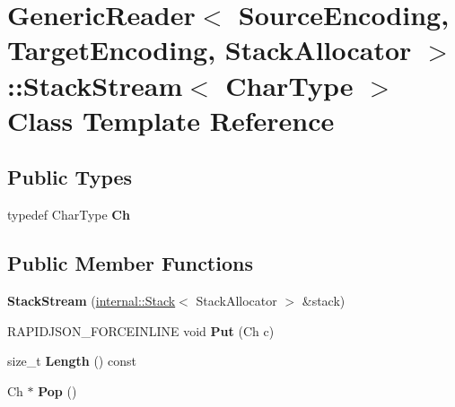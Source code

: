 \hypertarget{class_generic_reader_1_1_stack_stream}{}\section{Generic\+Reader$<$ Source\+Encoding, Target\+Encoding, Stack\+Allocator $>$\+:\+:Stack\+Stream$<$ Char\+Type $>$ Class Template Reference}
\label{class_generic_reader_1_1_stack_stream}
\subsection*{Public Types}
\begin{DoxyCompactItemize}
\item 
typedef Char\+Type {\bfseries Ch}\hypertarget{class_generic_reader_1_1_stack_stream_a8b6ba64b97ed5f79f17d96428fd50ec0}{}\label{class_generic_reader_1_1_stack_stream_a8b6ba64b97ed5f79f17d96428fd50ec0}

\end{DoxyCompactItemize}
\subsection*{Public Member Functions}
\begin{DoxyCompactItemize}
\item 
{\bfseries Stack\+Stream} (\hyperlink{classinternal_1_1_stack}{internal\+::\+Stack}$<$ Stack\+Allocator $>$ \&stack)\hypertarget{class_generic_reader_1_1_stack_stream_a288cf0f0385f706856b0e19c447e74ab}{}\label{class_generic_reader_1_1_stack_stream_a288cf0f0385f706856b0e19c447e74ab}

\item 
R\+A\+P\+I\+D\+J\+S\+O\+N\+\_\+\+F\+O\+R\+C\+E\+I\+N\+L\+I\+NE void {\bfseries Put} (Ch c)\hypertarget{class_generic_reader_1_1_stack_stream_aba4f7888d42e872ccbf668289373006f}{}\label{class_generic_reader_1_1_stack_stream_aba4f7888d42e872ccbf668289373006f}

\item 
size\+\_\+t {\bfseries Length} () const \hypertarget{class_generic_reader_1_1_stack_stream_abe63b4ec2320b9eb83013d29e731bf20}{}\label{class_generic_reader_1_1_stack_stream_abe63b4ec2320b9eb83013d29e731bf20}

\item 
Ch $\ast$ {\bfseries Pop} ()\hypertarget{class_generic_reader_1_1_stack_stream_a4c654610639025799a533b188cdfeb62}{}\label{class_generic_reader_1_1_stack_stream_a4c654610639025799a533b188cdfeb62}

\end{DoxyCompactItemize}

